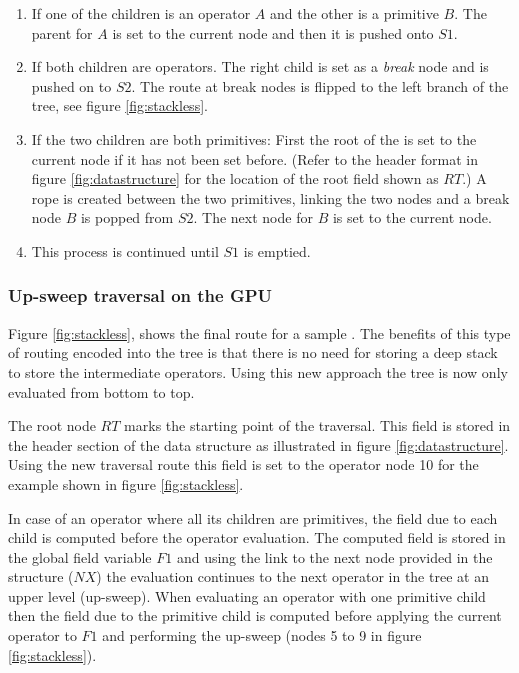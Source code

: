 \begin{enumerate}
 \item If one of the children is an operator $A$ and the other is a primitive $B$. The parent for $A$ is set 
 to the current node and then it is pushed onto $S1$.
 
 \item If both children are operators. The right child is set as a \textit{break} node and is pushed on to $S2$. 
 The route at break nodes is flipped to the left branch of the tree, see figure \ref{fig:stackless}. 
 
 \item If the two children are both primitives: First the root of the \blob is set to the current node if it has not been set before.
  (Refer to the \blob header format in figure \ref{fig:datastructure} for the location of the root field shown as $RT$.) 
  A rope is created between the two primitives, linking the two nodes and a break node $B$ is popped from $S2$. 
  The next node for $B$ is set to the current node.
 
  
 \item This process is continued until $S1$ is emptied.
\end{enumerate}




\subsubsection{Up-sweep traversal on the GPU}
Figure \ref{fig:stackless}, shows the final route for a sample \blob. The benefits of this type of routing encoded into the tree
is that there is no need for storing a deep stack to store the intermediate operators. Using this new approach the tree is now only evaluated 
from bottom to top. 

The \blob root node $RT$ marks the starting point of the traversal. This field is stored in the header section of the 
data structure as illustrated in figure \ref{fig:datastructure}. Using the new traversal route this field is set to
the operator node 10 for the example \blob shown in figure \ref{fig:stackless}. 

In case of an operator where all its children are primitives, the field due to each child is computed before the operator evaluation. 
The computed field is stored in the global field variable $F1$ and using the link to the next node provided in the structure ($NX$) 
the evaluation continues to the next operator in the tree at an upper level (up-sweep). When evaluating an operator with one primitive
child then the field due to the primitive child is computed before applying the current operator to $F1$ and performing the up-sweep (nodes 5 to 9 in 
figure \ref{fig:stackless}).

